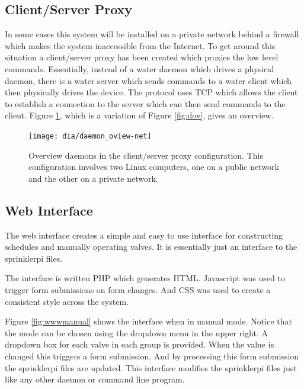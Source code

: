 \documentclass{article}
\begin{document}
\FloatBarrier
\subsection{Client/Server Proxy}
\label{sec:proxy}

In some cases this system will be installed on a private network
behind a firewall which makes the system inaccessible from the Internet.
To get around this situation a client/server proxy has been created
which proxies the low level commands.
Essentially, instead of a water daemon which drives a physical daemon,
there is a water server which sends commands to a water client which
then physically drives the device.
The protocol uses TCP which allows the client to establish a connection
to the server which can then send commands to the client.
Figure \ref{fig:dov-net}, which is a variation of Figure \ref{fig:dov},
gives an overview.

\begin{figure}[h!]
\begin{center}
\texttt{[image: dia/daemon\_oview-net]}
\end{center}
\caption{Overview daemons in the client/server proxy configuration.
This configuration involves two Linux computers, one on a public
network and the other on a private network.}
\label{fig:dov-net}
\end{figure}


\FloatBarrier
\subsection{Web Interface}
\label{sec:proxy}

The web interface creates a simple and easy to use interface for
constructing schedules and manually operating valves.
It is essentially just an interface to the sprinklerpi files.

The interface is written PHP which generates HTML.
Javascript was used to trigger form submissions on form changes.
And CSS was used to create a consistent style across the system.

Figure \ref{fig:wwwmanual} shows the interface when in manual mode.
Notice that the mode can be chosen using the dropdown menu in
the upper right.
A dropdown box for each valve in each group is provided.
When the value is changed this triggers a form submission.
And by processing this form submission the sprinklerpi files
are updated.
This interface modifies the sprinklerpi files just like any other
daemon or command line program.
\end{document}
